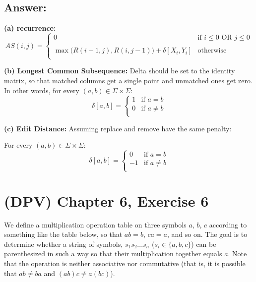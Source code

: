 \documentclass[12pt, letterpaper]{article}
\begin{document}
\subsection*{Answer:}
\vspace{5mm}
\noindent\textbf{(a) recurrence:}
\begin{equation*}
    AS(i, j) = 
    \begin{cases}
    0 & \text{if } i \leq 0 \text{  OR  } j \leq 0 \\
    &\\
    \max \big( R(i-1, j) ,  R(i, j-1) \big) + \delta [X_i , Y_i] & \text{otherwise} \\
    \end{cases}
\end{equation*}

\noindent\textbf{(b) Longest Common Subsequence:}
Delta should be set to the identity matrix, so that matched columns get a single point and unmatched ones get zero.
In other words, for every $(a, b) \in \Sigma \times \Sigma$:
\begin{equation*}
    \delta [a, b] = 
    \begin{cases}
    1 & \text{if } a = b \\
    0 & \text{if } a \neq b \\
    \end{cases}
\end{equation*}

\noindent\textbf{(c) Edit Distance:}
Assuming replace and remove have the same penalty:

\noindent For every $(a, b) \in \Sigma \times \Sigma$:
\begin{equation*}
    \delta [a, b] = 
    \begin{cases}
    0 & \text{if } a = b \\
    -1 & \text{if } a \neq b \\
    \end{cases}
\end{equation*}

\clearpage
\section{(DPV) Chapter 6, Exercise 6}
We define a multiplication operation table on three symbols $a$, $b$, $c$ according to something like the table below, so that $ab = b$, $ca = a$, and so on. 
The goal is to determine whether a string of symbols, $s_1 s_2 ... s_n$ ($s_i \in \{a, b, c\}$) can be parenthesized in such a way so that their multiplication together equals $a$. 
Note that the operation is neither associative nor commutative (that is, it is possible that $ab \neq ba$ and $(ab)c \neq a(bc)$).
\end{document}
